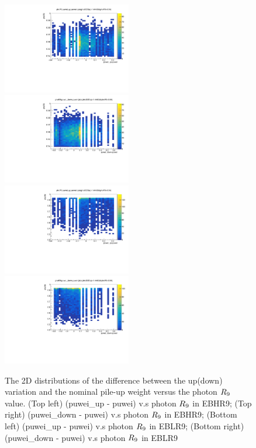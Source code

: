 	\begin{figure}[p]
	  \begin{center}
	    \includegraphics[width=0.50\textwidth]{Fig/puwei_check/phoR9VSpuweiupdiff_EBHR9}~
	    \includegraphics[width=0.50\textwidth]{Fig/puwei_check/phoR9VSpuweidowndiff_EBHR9}\\
	    \includegraphics[width=0.50\textwidth]{Fig/puwei_check/phoR9VSpuweiupdiff_EBLR9}~
	    \includegraphics[width=0.50\textwidth]{Fig/puwei_check/phoR9VSpuweidowndiff_EBLR9}\\
	    \bigskip
	    \caption{The 2D distributions of the difference between the up(down) variation and the nominal pile-up weight versus the photon $R_\mathrm{9}$ value. (Top left) (puwei\_up - puwei) v.s photon $R_\mathrm{9}$ in EBHR9; (Top right) (puwei\_down - puwei) v.s photon $R_\mathrm{9}$ in EBHR9; (Bottom left) (puwei\_up - puwei) v.s photon $R_\mathrm{9}$ in EBLR9; (Bottom right) (puwei\_down - puwei) v.s photon $R_\mathrm{9}$ in EBLR9}
	  \label{fig:puweidiffvsphoR9}
	  \end{center}
	\end{figure}
	
